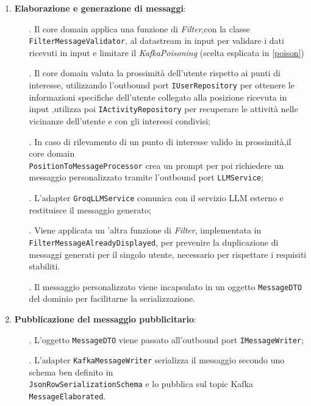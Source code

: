 \documentclass[10pt]{article}
\begin{document}
\begin{enumerate}
        \item \textbf{Elaborazione e generazione di messaggi}:
        \begin{itemize}
            \item[.] Il core domain applica una funzione di \textit{Filter},con la classe \texttt{FilterMessageValidator}, al datastream in input per validare i dati ricevuti in input e limitare il \textit{KafkaPoisoning} (scelta esplicata in \ref{poison})
            \item[.] Il core domain valuta la prossimità dell'utente rispetto ai punti di interesse, utilizzando l'outbound port \texttt{IUserRepository} per ottenere le informazioni specifiche dell'utente collegato alla posizione ricevuta in input ,utilizza poi \texttt{IActivityRepository} per recuperare le attività nelle vicinanze dell'utente e con gli interessi condivisi;
            \item[.] In caso di rilevamento di un punto di interesse valido in prossimità,il core domain \\\texttt{PositionToMessageProcessor} crea un prompt per poi richiedere un messaggio personalizzato tramite l'outbound port \texttt{LLMService};
            \item[.] L'adapter \texttt{GroqLLMService} comunica con il servizio LLM esterno e restituisce il messaggio generato;
            \item[.] Viene applicata un 'altra funzione di \textit{Filter}, implementata in \texttt{FilterMessageAlreadyDisplayed}, per prevenire la duplicazione di messaggi generati per il singolo utente, necessario per rispettare i requisiti stabiliti. 
            \item[.] Il messaggio personalizzato viene incapsulato in un oggetto \texttt{MessageDTO} del dominio per facilitarne la serializzazione.
        \end{itemize}

        \item \textbf{Pubblicazione del messaggio pubblicitario}:
        \begin{itemize}
            \item[.] L'oggetto \texttt{MessageDTO} viene passato all'outbound port \texttt{IMessageWriter};
            \item[.] L'adapter \texttt{KafkaMessageWriter} serializza il messaggio secondo uno schema ben definito in \\ \texttt{JsonRowSerializationSchema} e lo pubblica sul topic Kafka \texttt{MessageElaborated}.
        \end{itemize}


\end{enumerate}
\end{document}
